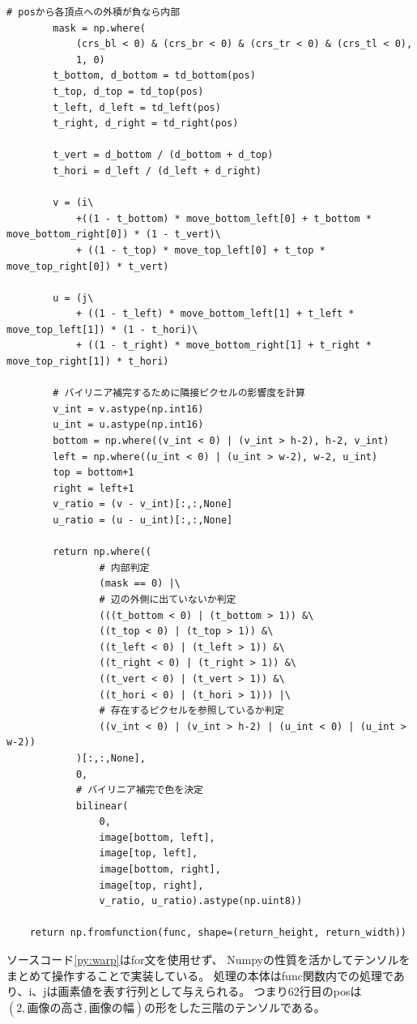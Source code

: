 \begin{lstlisting}[caption=ワーピング, label=py:warp]
        # posから各頂点への外積が負なら内部
        mask = np.where(
            (crs_bl < 0) & (crs_br < 0) & (crs_tr < 0) & (crs_tl < 0), 
            1, 0)
        t_bottom, d_bottom = td_bottom(pos)
        t_top, d_top = td_top(pos)
        t_left, d_left = td_left(pos)
        t_right, d_right = td_right(pos)

        t_vert = d_bottom / (d_bottom + d_top)
        t_hori = d_left / (d_left + d_right)

        v = (i\
            +((1 - t_bottom) * move_bottom_left[0] + t_bottom * move_bottom_right[0]) * (1 - t_vert)\
            + ((1 - t_top) * move_top_left[0] + t_top * move_top_right[0]) * t_vert)

        u = (j\
            + ((1 - t_left) * move_bottom_left[1] + t_left * move_top_left[1]) * (1 - t_hori)\
            + ((1 - t_right) * move_bottom_right[1] + t_right * move_top_right[1]) * t_hori)
        
        # バイリニア補完するために隣接ピクセルの影響度を計算
        v_int = v.astype(np.int16)
        u_int = u.astype(np.int16)
        bottom = np.where((v_int < 0) | (v_int > h-2), h-2, v_int)
        left = np.where((u_int < 0) | (u_int > w-2), w-2, u_int)
        top = bottom+1
        right = left+1
        v_ratio = (v - v_int)[:,:,None]
        u_ratio = (u - u_int)[:,:,None]

        return np.where((
                # 内部判定
                (mask == 0) |\
                # 辺の外側に出ていないか判定
                (((t_bottom < 0) | (t_bottom > 1)) &\
                ((t_top < 0) | (t_top > 1)) &\
                ((t_left < 0) | (t_left > 1)) &\
                ((t_right < 0) | (t_right > 1)) &\
                ((t_vert < 0) | (t_vert > 1)) &\
                ((t_hori < 0) | (t_hori > 1))) |\
                # 存在するピクセルを参照しているか判定
                ((v_int < 0) | (v_int > h-2) | (u_int < 0) | (u_int > w-2))
            )[:,:,None],
            0, 
            # バイリニア補完で色を決定
            bilinear(
                0, 
                image[bottom, left],
                image[top, left],
                image[bottom, right],
                image[top, right],
                v_ratio, u_ratio).astype(np.uint8))

    return np.fromfunction(func, shape=(return_height, return_width))
\end{lstlisting}
ソースコード\ref{py:warp}はfor文を使用せず、
Numpyの性質を活かしてテンソルをまとめて操作することで実装している。
処理の本体はfunc関数内での処理であり、i、jは画素値を表す行列として与えられる。
つまり62行目のposは$(2, 画像の高さ, 画像の幅)$の形をした三階のテンソルである。

